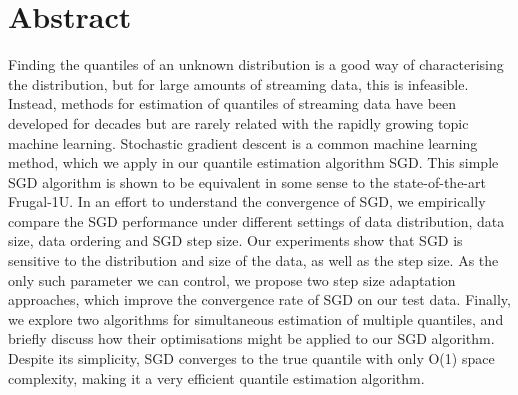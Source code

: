 


\begingroup
\let\clearpage\relax
\let\cleardoublepage\relax
\let\cleardoublepage\relax

\chapter*{Abstract}

Finding the quantiles of an unknown distribution is a good way of characterising the distribution, but for large amounts of streaming data, this is infeasible. Instead, methods for estimation of quantiles of streaming data have been developed for decades but are rarely related with the rapidly growing topic machine learning.
Stochastic gradient descent is a common machine learning method, which we apply in our quantile estimation algorithm SGD. This simple SGD algorithm is shown to be equivalent in some sense to the state-of-the-art Frugal-1U. 
In an effort to understand the convergence of SGD, we empirically compare the SGD performance under different settings of data distribution, data size, data ordering and SGD step size. Our experiments show that SGD is sensitive to the distribution and size of the data, as well as the step size.
As the only such parameter we can control, we propose two step size adaptation approaches, which improve the convergence rate of SGD on our test data.
Finally, we explore two algorithms for simultaneous estimation of multiple quantiles, and briefly discuss how their optimisations might be applied to our SGD algorithm.
Despite its simplicity, SGD converges to the true quantile with only O(1) space complexity, making it a very efficient quantile estimation algorithm.

\endgroup			

\vfill
